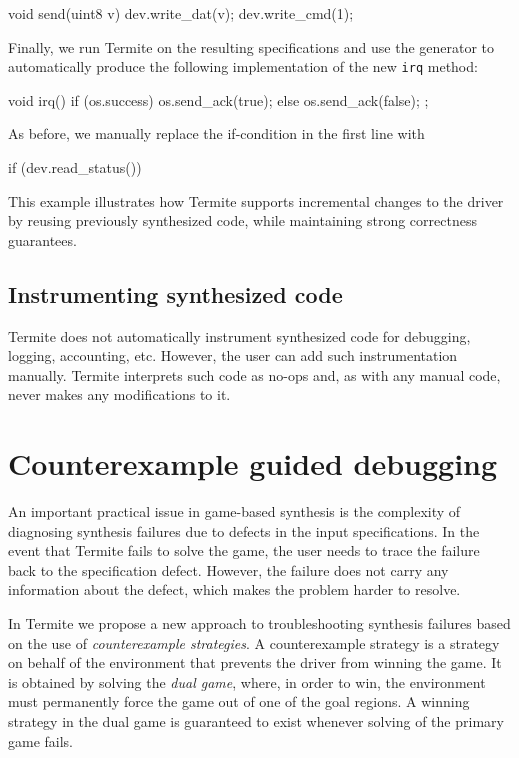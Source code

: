 \documentclass[a4paper,twoside,openright,11pt]{book}
\newcommand{\termite}{Termite\xspace}
\theoremstyle{definition}
\newcommand{\src}[1]{\texttt{\small #1}}
\begin{document}
\begin{tsllisting}[keywords=, frame=single]
void send(uint8 v){
    dev.write_dat(v);
    dev.write_cmd(1);}
\end{tsllisting}

Finally, we run \termite on the resulting specifications and use the generator to automatically produce the following implementation of the new \src{irq} method:

\begin{tsllisting}[keywords=, frame=single]
void irq(){
    if (os.success) {
        os.send_ack(true);
    } else {
        os.send_ack(false);
    };}
\end{tsllisting}

As before, we manually replace the if-condition in the first line with

\begin{tsllisting}[keywords=, frame=single]
if (dev.read_status())
\end{tsllisting}

This example illustrates how \termite supports incremental changes to the driver by reusing previously synthesized code, while maintaining strong correctness guarantees.

\subsection{Instrumenting synthesized code~~} 
\termite does not automatically instrument synthesized code for debugging, logging, accounting, etc.  However, the user can add such instrumentation manually.  \termite interprets such code as no-ops and, as with any manual code, never makes any modifications to it.

\section{Counterexample guided debugging}

An important practical issue in game-based synthesis is the complexity of diagnosing synthesis failures due to defects in the input specifications.  In the event that \termite fails to solve the game, the user needs to trace the failure back to the specification defect.  However, the failure does not carry any information about the defect, which makes the problem harder to resolve.

In \termite we propose a new approach to troubleshooting synthesis failures based on the use of \emph{counterexample strategies}.  A counterexample strategy is a strategy on behalf of the environment that prevents the driver from winning the game.  It is obtained by solving the \emph{dual game}, where, in order to win, the environment must permanently force the game out of one of the goal regions.  A winning strategy in the dual game is guaranteed to exist whenever solving of the primary game fails.
\end{document}
